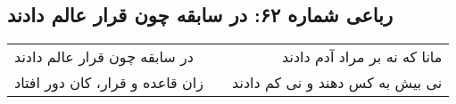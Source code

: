 \begin{center}
\section*{رباعی شماره ۶۲: در سابقه چون قرار عالم دادند}
\label{sec:062}
\begin{longtable}{l p{0.5cm} r}
در سابقه چون قرار عالم دادند
&&
مانا که نه بر مراد آدم دادند
\\
زان قاعده و قرار، کان دور افتاد
&&
نی بیش به کس دهند و نی کم دادند
\\
\end{longtable}
\end{center}
